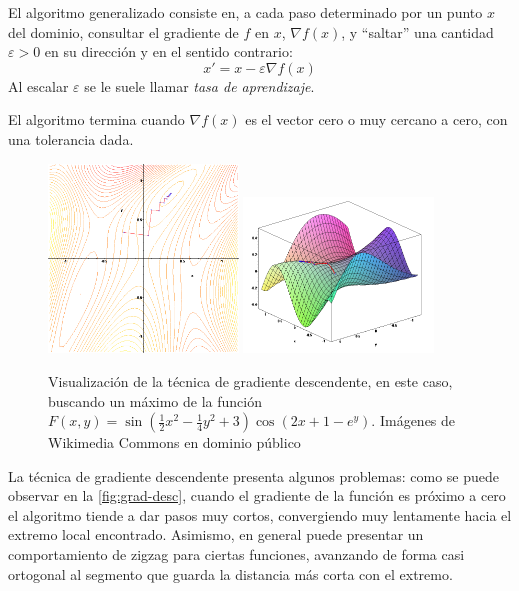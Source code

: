 El algoritmo generalizado consiste en, a cada paso determinado por un
punto \(x\) del dominio, consultar el gradiente de \(f\) en \(x\),
\(\nabla f(x)\), y ``saltar'' una cantidad \(\varepsilon>0\) en su
dirección y en el sentido contrario: \[x' = x - \varepsilon\nabla f(x)\]
Al escalar \(\varepsilon\) se le suele llamar \emph{tasa de
aprendizaje}.

El algoritmo termina cuando \(\nabla f(x)\) es el vector cero o muy
cercano a cero, con una tolerancia dada.

\begin{figure}[hbtp]
  \centering
  \includegraphics[width=0.45\textwidth]{images/gradient_ascent_contour.png}
  \includegraphics[width=0.45\textwidth]{images/gradient_ascent_surface.png}
  \caption{\label{fig:grad-desc}Visualización de la técnica de gradiente descendente, en este caso, buscando un máximo de la función $F(x,y)=\sin\left(\frac{1}{2} x^2 - \frac{1}{4} y^2 + 3 \right) \cos(2 x+1-e^y)$. Imágenes de Wikimedia Commons en dominio público}
\end{figure}

La técnica de gradiente descendente presenta algunos problemas: como se
puede observar en la \autoref{fig:grad-desc}, cuando el gradiente de
la función es próximo a cero el algoritmo tiende a dar pasos muy cortos,
convergiendo muy lentamente hacia el extremo local encontrado. Asimismo,
en general puede presentar un comportamiento de zigzag para ciertas
funciones, avanzando de forma casi ortogonal al segmento que guarda la
distancia más corta con el extremo.
